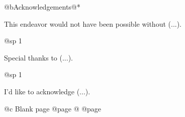 @b{Acknowledgements}@*

This endeavor would not have been possible without (...).

@sp 1

Special thanks to (...).

@sp 1

I'd like to acknowledge (...).

@c Blank page
@page
@
@page
